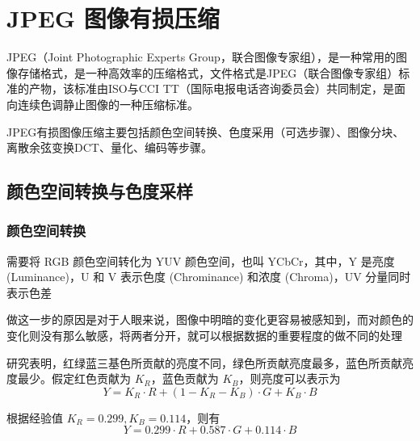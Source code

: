 \chapter{JPEG 图像有损压缩}
JPEG（Joint Photographic Experts Group，联合图像专家组），是一种常用的图像存储格式，是一种高效率的压缩格式，文件格式是JPEG（联合图像专家组）标准的产物，该标准由ISO与CCI TT（国际电报电话咨询委员会）共同制定，是面向连续色调静止图像的一种压缩标准。

JPEG有损图像压缩主要包括颜色空间转换、色度采用（可选步骤）、图像分块、离散余弦变换DCT、量化、编码等步骤。

\section{颜色空间转换与色度采样}
\subsection{颜色空间转换}

需要将 RGB 颜色空间转化为 YUV 颜色空间，也叫 YCbCr，其中，Y 是亮度 (Luminance)，U 和 V 表示色度 (Chrominance) 和浓度 (Chroma)，UV 分量同时表示色差

做这一步的原因是对于人眼来说，图像中明暗的变化更容易被感知到，而对颜色的变化则没有那么敏感，将两者分开，就可以根据数据的重要程度的做不同的处理


研究表明，红绿蓝三基色所贡献的亮度不同，绿色所贡献亮度最多，蓝色所贡献亮度最少。假定红色贡献为 $K_R$，蓝色贡献为 $K_B$，则亮度可以表示为
\begin{equation}
    Y = K_R \cdot R + (1-K_R-K_B) \cdot G + K_B \cdot B
\end{equation}

根据经验值 $K_R=0.299, K_B=0.114$，则有
\begin{equation}
    Y = 0.299 \cdot R + 0.587 \cdot G + 0.114 \cdot B
\end{equation}

